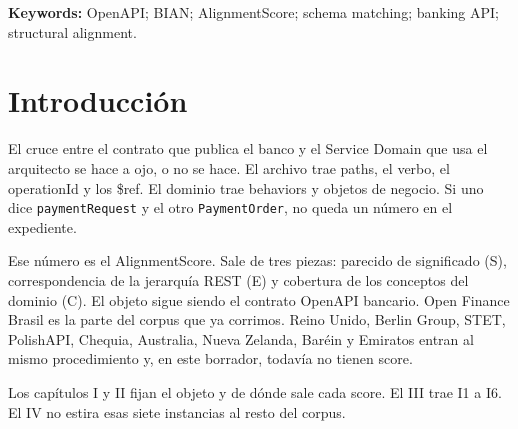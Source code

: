 \vspace{0.4cm}
\noindent\textbf{Keywords:} OpenAPI; BIAN; AlignmentScore; schema matching; banking API; structural alignment.

\chapter*{Introducción}

El cruce entre el contrato que publica el banco y el Service Domain que usa el arquitecto se hace a ojo, o no se hace. El archivo trae paths, el verbo, el operationId y los \$ref. El dominio trae behaviors y objetos de negocio. Si uno dice \texttt{paymentRequest} y el otro \texttt{PaymentOrder}, no queda un número en el expediente.

Ese número es el AlignmentScore. Sale de tres piezas: parecido de significado (S), correspondencia de la jerarquía REST (E) y cobertura de los conceptos del dominio (C). El objeto sigue siendo el contrato OpenAPI bancario. Open Finance Brasil es la parte del corpus que ya corrimos. Reino Unido, Berlin Group, STET, PolishAPI, Chequia, Australia, Nueva Zelanda, Baréin y Emiratos entran al mismo procedimiento y, en este borrador, todavía no tienen score.

Los capítulos I y II fijan el objeto y de dónde sale cada score. El III trae I1 a I6. El IV no estira esas siete instancias al resto del corpus.
